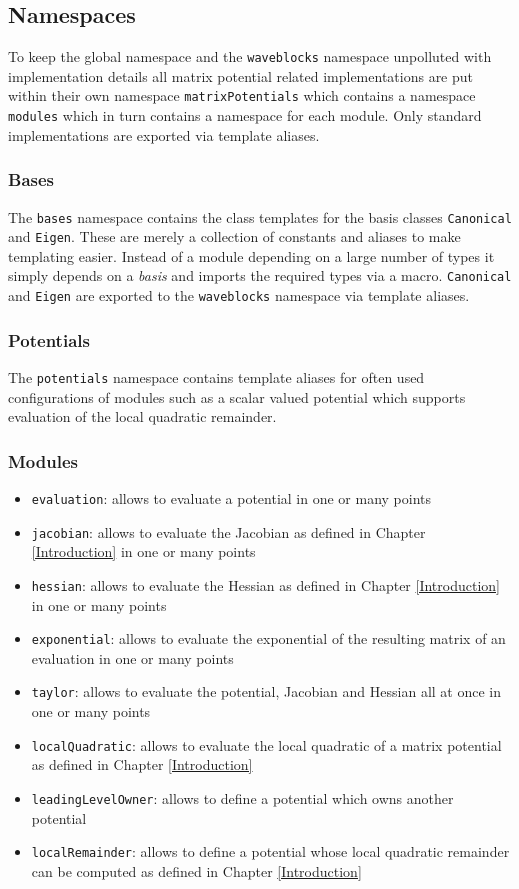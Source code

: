 \subsection{Namespaces}
To keep the global namespace and the \texttt{waveblocks} namespace unpolluted with implementation details all matrix potential related implementations are put within their own namespace \texttt{matrixPotentials} which contains a namespace \texttt{modules} which in turn contains a namespace for each module. Only standard implementations are exported via template aliases.

\subsubsection{Bases}
The \texttt{bases} namespace contains the class templates for the basis classes \texttt{Canonical} and \texttt{Eigen}. These are merely a collection of constants and aliases to make templating easier. Instead of a module depending on a large number of types it simply depends on a \textit{basis} and imports the required types via a macro.
\texttt{Canonical} and \texttt{Eigen} are exported to the \texttt{waveblocks} namespace via template aliases.

\subsubsection{Potentials}
The \texttt{potentials} namespace contains template aliases for often used configurations of modules such as a scalar valued potential which supports evaluation of the local quadratic remainder.

\subsubsection{Modules}
\begin{itemize}
\item \texttt{evaluation}: allows to evaluate a potential in one or many points
\item \texttt{jacobian}: allows to evaluate the Jacobian as defined in Chapter \ref{Introduction} in one or many points
\item \texttt{hessian}: allows to evaluate the Hessian as defined in Chapter \ref{Introduction} in one or many points
\item \texttt{exponential}: allows to evaluate the exponential of the resulting matrix of an evaluation in one or many points
\item \texttt{taylor}: allows to evaluate the potential, Jacobian and Hessian all at once in one or many points
\item \texttt{localQuadratic}: allows to evaluate the local quadratic of a matrix potential as defined in Chapter \ref{Introduction}
\item \texttt{leadingLevelOwner}: allows to define a potential which owns another potential
\item \texttt{localRemainder}: allows to define a potential whose local quadratic remainder can be computed as defined in Chapter \ref{Introduction}
\end{itemize}

